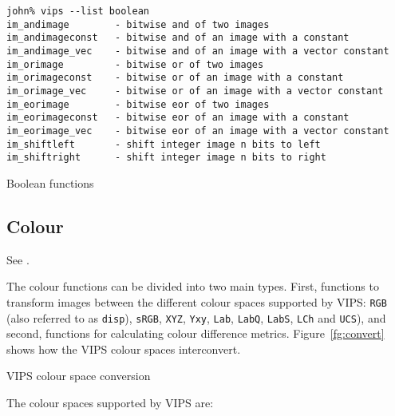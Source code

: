 \begin{fig2}
\begin{verbatim}
john% vips --list boolean
im_andimage        - bitwise and of two images
im_andimageconst   - bitwise and of an image with a constant
im_andimage_vec    - bitwise and of an image with a vector constant
im_orimage         - bitwise or of two images
im_orimageconst    - bitwise or of an image with a constant
im_orimage_vec     - bitwise or of an image with a vector constant
im_eorimage        - bitwise eor of two images
im_eorimageconst   - bitwise eor of an image with a constant
im_eorimage_vec    - bitwise eor of an image with a vector constant
im_shiftleft       - shift integer image n bits to left
im_shiftright      - shift integer image n bits to right
\end{verbatim}
\caption{Boolean functions}
\label{fg:boolean}
\end{fig2}

\subsection{Colour}
\label{sec:colour}

See .

The colour functions can be divided into two main types. First, functions to
transform images between the different colour spaces supported by VIPS:
\verb+RGB+ (also referred to as \verb+disp+), \verb+sRGB+,  \verb+XYZ+,
\verb+Yxy+, \verb+Lab+, \verb+LabQ+, \verb+LabS+, \verb+LCh+ and
\verb+UCS+), and second, functions for calculating colour difference
metrics. Figure~\ref{fg:convert} shows how the VIPS colour spaces
interconvert.

\begin{fig2}
\caption{VIPS colour space conversion}
\label{fg:convert}
\end{fig2}

The colour spaces supported by VIPS are:

